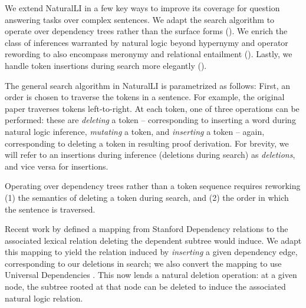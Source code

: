 We extend NaturalLI in a few key ways to improve its coverage for question
  answering tasks over complex sentences.
We adapt the search algorithm to operate over dependency
  trees rather than the surface forms ().
We enrich the class of inferences warranted by natural logic beyond
  hypernymy and operator rewording to also encompass meronymy and
  relational entailment ().
Lastly, we handle token insertions during search more elegantly
  ().

The general search algorithm in NaturalLI is parametrized as follows:
First, an order is chosen to traverse the tokens in a sentence.
For example, the original paper traverses tokens left-to-right.
At each token, one of three operations can be performed:
  these are \textit{deleting} a token
  -- corresponding to inserting a word during natural logic inference,
  \textit{mutating} a token, and \textit{inserting} a token -- again, corresponding
  to deleting a token in resulting proof derivation.
For brevity, we will refer to an insertions during inference (deletions during
  search) as \textit{deletions}, and vice versa for insertions.

%
%
Operating over dependency trees rather than a token sequence requires reworking
  (1) the semantics of deleting a token during search, and 
  (2) the order in which the sentence is traversed.


Recent work by  defined a mapping from Stanford
  Dependency relations to the associated lexical relation deleting the
  dependent subtree would induce.
We adapt this mapping to yield the relation induced by \textit{inserting} a
  given dependency edge, corresponding to our deletions in search;
  we also convert the mapping to use Universal Dependencies
  \cite{key:stanford-ud}.
This now lends a natural deletion operation: at a given node, the subtree rooted
  at that node can be deleted to induce the associated natural logic relation.

